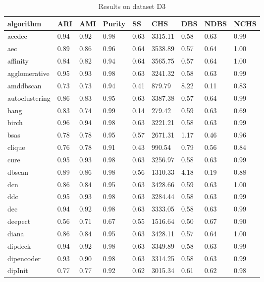 \begin{table}[H]
\centering
\caption{Results on dataset D3}
\label{tab:params:D3}
\begin{tabular}{|l|l|l|l|l|l|l|l|l|}
\hline
algorithm & ARI & AMI & Purity & SS & CHS & DBS & NDBS & NCHS \\
\hline
acedec & 0.94 & 0.92 & 0.98 & 0.63 & 3315.11 & 0.58 & 0.63 & 0.99 \\
\hline
aec & 0.89 & 0.86 & 0.96 & 0.64 & 3538.89 & 0.57 & 0.64 & 1.00 \\
\hline
affinity & 0.84 & 0.82 & 0.94 & 0.64 & 3565.75 & 0.57 & 0.64 & 1.00 \\
\hline
agglomerative & 0.95 & 0.93 & 0.98 & 0.63 & 3241.32 & 0.58 & 0.63 & 0.99 \\
\hline
amddbscan & 0.73 & 0.73 & 0.94 & 0.41 & 879.79 & 8.22 & 0.11 & 0.83 \\
\hline
autoclustering & 0.86 & 0.83 & 0.95 & 0.63 & 3387.38 & 0.57 & 0.64 & 0.99 \\
\hline
bang & 0.83 & 0.74 & 0.99 & 0.14 & 279.42 & 0.59 & 0.63 & 0.69 \\
\hline
birch & 0.96 & 0.94 & 0.98 & 0.63 & 3221.21 & 0.58 & 0.63 & 0.99 \\
\hline
bsas & 0.78 & 0.78 & 0.95 & 0.57 & 2671.31 & 1.17 & 0.46 & 0.96 \\
\hline
clique & 0.76 & 0.78 & 0.91 & 0.43 & 990.54 & 0.79 & 0.56 & 0.84 \\
\hline
cure & 0.95 & 0.93 & 0.98 & 0.63 & 3256.97 & 0.58 & 0.63 & 0.99 \\
\hline
dbscan & 0.89 & 0.86 & 0.98 & 0.56 & 1310.33 & 4.18 & 0.19 & 0.88 \\
\hline
dcn & 0.86 & 0.84 & 0.95 & 0.63 & 3428.66 & 0.59 & 0.63 & 1.00 \\
\hline
ddc & 0.95 & 0.93 & 0.98 & 0.63 & 3284.44 & 0.58 & 0.63 & 0.99 \\
\hline
dec & 0.94 & 0.92 & 0.98 & 0.63 & 3333.05 & 0.58 & 0.63 & 0.99 \\
\hline
deepect & 0.56 & 0.71 & 0.67 & 0.55 & 1516.64 & 0.50 & 0.67 & 0.90 \\
\hline
diana & 0.86 & 0.84 & 0.95 & 0.63 & 3428.11 & 0.57 & 0.64 & 1.00 \\
\hline
dipdeck & 0.94 & 0.92 & 0.98 & 0.63 & 3349.89 & 0.58 & 0.63 & 0.99 \\
\hline
dipencoder & 0.93 & 0.90 & 0.98 & 0.63 & 3314.25 & 0.58 & 0.63 & 0.99 \\
\hline
dipInit & 0.77 & 0.77 & 0.92 & 0.62 & 3015.34 & 0.61 & 0.62 & 0.98 \\

\end{tabular}
\end{table}
